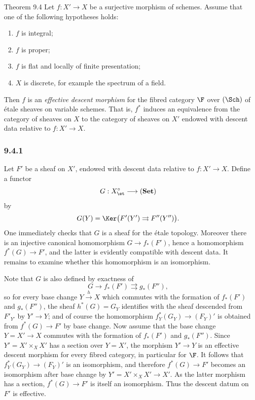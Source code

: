 \begin{statement}{Theorem 9.4}
Let \(f:X'\to X\) be a surjective morphism of schemes. Assume that one of the following hypotheses holds:
\begin{enumerate}[label=\alph*)]
\item \(f\) is integral;
\item \(f\) is proper;
\item \(f\) is flat and locally of finite presentation;
\item \(X\) is discrete, for example the spectrum of a field.
\end{enumerate}
Then \(f\) is an \emph{effective descent morphism} for the fibred category \(\F\) over \((\Sch)\) of \'etale sheaves on variable schemes. That is, \(f^*\) induces an equivalence from the category of sheaves on \(X\) to the category of sheaves on \(X'\) endowed with descent data relative to \(f:X'\to X\).
\end{statement}

\subsubsection*{9.4.1}
Let \(F'\) be a sheaf on \(X'\), endowed with descent data relative to \(f:X'\to X\). Define a functor
\[
G:X_{\et}^\circ\longrightarrow(\mathbf{Set})
\]
by
\[
G(Y)=\Ker\bigl(F'(Y')\rightrightarrows F''(Y'')\bigr).
\]
One immediately checks that \(G\) is a sheaf for the \'etale topology. Moreover there is an injective canonical homomorphism \(G\to f_*(F')\), hence a homomorphism \(f^*(G)\to F'\), and the latter is evidently compatible with descent data. It remains to examine whether this homomorphism is an isomorphism.

Note that \(G\) is also defined by exactness of
\[
G\longrightarrow f_*(F')\rightrightarrows g_*(F''),
\]
so for every base change \(Y\xrightarrow{h}X\) which commutes with the formation of \(f_*(F')\) and \(g_*(F'')\), the sheaf \(h^*(G)=G_Y\) identifies with the sheaf descended from \(F'_{Y'}\) by \(Y'\to Y\); and of course the homomorphism \(f_Y^*(G_Y)\to (F_Y)'\) is obtained from \(f^*(G)\to F'\) by base change. Now assume that the base change \(Y=X'\to X\) commutes with the formation of \(f_*(F')\) and \(g_*(F'')\). Since \(Y'=X'\times_XX'\) has a section over \(Y=X'\), the morphism \(Y'\to Y\) is an effective descent morphism for every fibred category, in particular for \(\F\). It follows that \(f_Y^*(G_Y)\to(F_Y)'\) is an isomorphism, and therefore \(f^*(G)\to F'\) becomes an isomorphism after base change by \(Y'=X'\times_XX'\to X'\). As the latter morphism has a section, \(f^*(G)\to F'\) is itself an isomorphism. Thus the descent datum on \(F'\) is effective.

